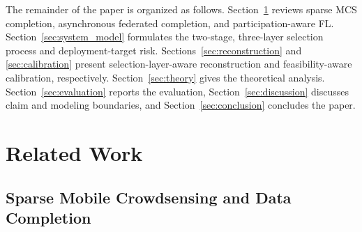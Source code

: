 \documentclass[letterpaper,journal]{IEEEtran}
\begin{document}
The remainder of the paper is organized as follows.
Section~\ref{sec:related_work} reviews sparse MCS completion, asynchronous
federated completion, and participation-aware FL.
Section~\ref{sec:system_model} formulates the two-stage, three-layer selection
process and deployment-target risk.
Sections~\ref{sec:reconstruction} and \ref{sec:calibration} present
selection-layer-aware reconstruction and feasibility-aware calibration,
respectively.
Section~\ref{sec:theory} gives the theoretical analysis.
Section~\ref{sec:evaluation} reports the evaluation,
Section~\ref{sec:discussion} discusses claim and modeling boundaries, and
Section~\ref{sec:conclusion} concludes the paper.


\section{Related Work}
\label{sec:related_work}

\subsection{Sparse Mobile Crowdsensing and Data Completion}
\end{document}
